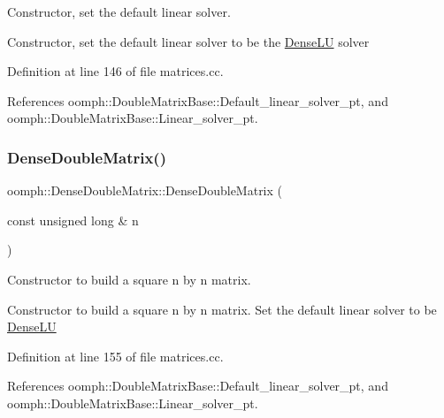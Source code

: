 Constructor, set the default linear solver. 

Constructor, set the default linear solver to be the \hyperlink{classoomph_1_1DenseLU}{Dense\+LU} solver 

Definition at line 146 of file matrices.\+cc.



References oomph\+::\+Double\+Matrix\+Base\+::\+Default\+\_\+linear\+\_\+solver\+\_\+pt, and oomph\+::\+Double\+Matrix\+Base\+::\+Linear\+\_\+solver\+\_\+pt.

\mbox{\label{classoomph_1_1DenseDoubleMatrix_a50b8a6f60661c30b3875212f67c83a04}} 
\subsubsection{\texorpdfstring{Dense\+Double\+Matrix()}{DenseDoubleMatrix()}\hspace{0.1cm}{\footnotesize\ttfamily [2/5]}}
{\footnotesize\ttfamily oomph\+::\+Dense\+Double\+Matrix\+::\+Dense\+Double\+Matrix (\begin{DoxyParamCaption}\item[{const unsigned long \&}]{n }\end{DoxyParamCaption})}



Constructor to build a square n by n matrix. 

Constructor to build a square n by n matrix. Set the default linear solver to be \hyperlink{classoomph_1_1DenseLU}{Dense\+LU} 

Definition at line 155 of file matrices.\+cc.



References oomph\+::\+Double\+Matrix\+Base\+::\+Default\+\_\+linear\+\_\+solver\+\_\+pt, and oomph\+::\+Double\+Matrix\+Base\+::\+Linear\+\_\+solver\+\_\+pt.

\mbox{\label{classoomph_1_1DenseDoubleMatrix_ab810633bd06c5d09b6b05d8173083e1e}} 
